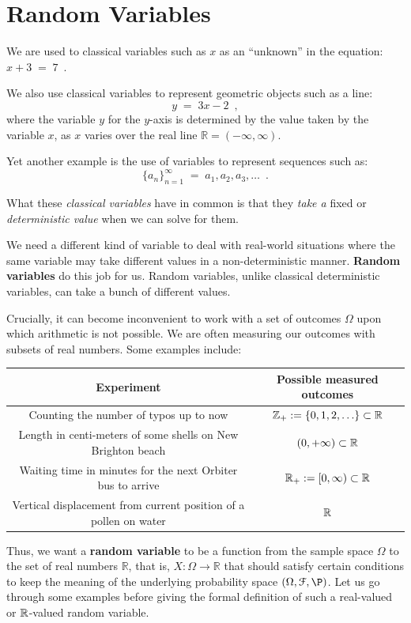 \chapter{Random Variables}\label{S:RandomVariable}

We are used to classical variables such as $x$ as an ``unknown'' in
the equation: $x+3\;=\;7 \enspace$.

We also  use classical variables to represent geometric objects such as a line:
\[
y\;=\;3x-2 \enspace ,
\]
where the variable $y$ for the $y$-axis is determined by the value taken
by the variable $x$, as $x$ varies over the real line $\mathbb{R} =
(-\infty,\infty)$.

Yet another example is the use  of variables  to represent sequences such as:
\[
\{a_n\}_{n=1}^{\infty}\; = \;a_1,a_2,a_3,\ldots \enspace.
\]

What these \emph{classical variables} have in common is that they \emph{take a} fixed or \emph{deterministic value} when we can solve for them.

We need a different kind of variable to deal with real-world situations where the same variable may take 
different values in a non-deterministic manner.  {\bf Random variables} do this job for us.  
Random variables, unlike classical deterministic variables, can take a bunch of different values.

Crucially, it can become inconvenient to work with a set of outcomes $\Omega$ upon which arithmetic is not possible. 
We are often measuring our outcomes with subsets of real numbers.  Some examples include:

\begin{table}[ht]
\begin{tabular}{c c} \hline
Experiment & Possible measured outcomes\\ \hline
Counting the number of typos up to now & $\mathbb{Z}_+:=\{0,1,2,\ldots\} \subset \mathbb{R}$ \\
Length in centi-meters of some shells on New Brighton beach & $(0,+\infty) \subset \mathbb{R}$ \\
Waiting time in minutes for the next Orbiter bus to arrive & $\mathbb{R}_+:=[0,\infty) \subset \mathbb{R}$\\
Vertical displacement from current position of a pollen on water & $\mathbb{R}$ \\ \hline
\end{tabular}
\end{table}

Thus, we want a \textbf{random variable} to be a function from the sample space $\Omega$ to the set of real numbers $\mathbb{R}$, that is,  $X : \Omega \to \mathbb{R}$ that should satisfy certain conditions to keep the meaning of the underlying probability space $(\Omega, \mathcal{F},\P)$. 
Let us go through some examples before giving the formal definition of such a real-valued or $\mathbb{R}$-valued random variable.


